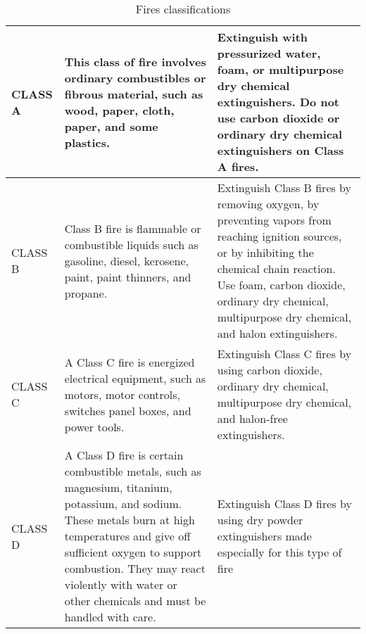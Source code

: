 \begin{table}[h!]
\begin{tabular}{|C{2cm}|p{5.5cm}|p{5.5cm}|}
CLASS A                                       & This class of fire involves ordinary combustibles  or fibrous material, such as wood, paper, cloth, paper, and some plastics.                                                                                                                                                               & Extinguish with pressurized   water, foam, or multipurpose dry chemical extinguishers. Do not use carbon   dioxide or ordinary dry chemical extinguishers on Class A fires.                                                                                \\ \hline
CLASS B                                       & Class B fire is flammable or   combustible liquids such as gasoline, diesel, kerosene, paint, paint   thinners, and propane.                                                                                                                                                                & Extinguish Class B fires by   removing oxygen, by preventing vapors from reaching ignition sources, or by   inhibiting the chemical chain reaction. Use foam, carbon dioxide, ordinary   dry chemical, multipurpose dry chemical, and halon extinguishers. \\ \hline
CLASS C                                       & A Class C fire is energized   electrical equipment, such as motors, motor controls, switches panel boxes,   and power tools.                                                                                                                                                                & Extinguish Class C fires by   using carbon dioxide, ordinary dry chemical, multipurpose dry chemical, and   halon-free extinguishers.                                                                                                                      \\ \hline
CLASS D                                       & A Class D fire is certain   combustible metals, such as magnesium, titanium, potassium, and sodium. These   metals burn at high temperatures and give off sufficient oxygen to support   combustion. They may react violently with water or other chemicals and must be   handled with care. & Extinguish Class D fires by   using dry powder extinguishers made especially for this type of fire                                                                                                                                                         \\ \hline
\end{tabular}
\caption{Fires classifications}
\label{table:FireClassification}
\end{table}

